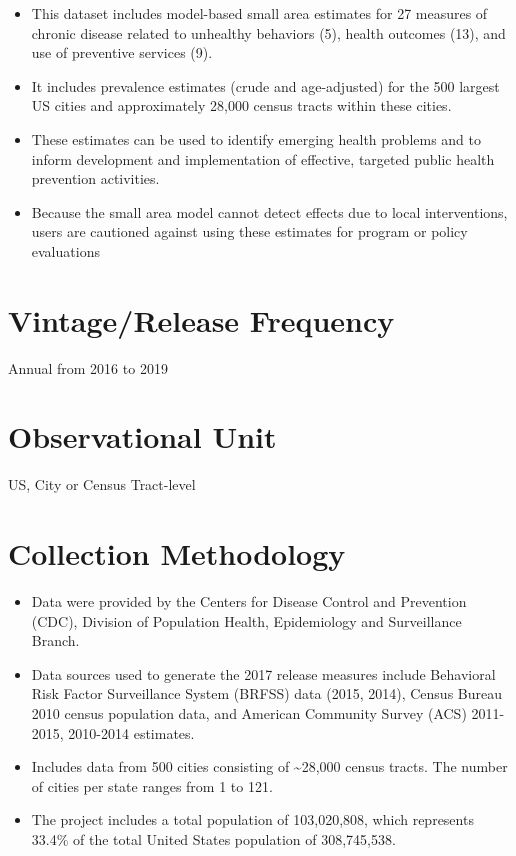 \documentclass[
]{book}
\providecommand{\tightlist}{%
  \setlength{\itemsep}{0pt}\setlength{\parskip}{0pt}}
\begin{document}
\begin{itemize}
\tightlist
\item
  This dataset includes model-based small area estimates for 27 measures of chronic disease related to unhealthy behaviors (5), health outcomes (13), and use of preventive services (9).
\item
  It includes prevalence estimates (crude and age-adjusted) for the 500 largest US cities and approximately 28,000 census tracts within these cities.
\item
  These estimates can be used to identify emerging health problems and to inform development and implementation of effective, targeted public health prevention activities.
\item
  Because the small area model cannot detect effects due to local interventions, users are cautioned against using these estimates for program or policy evaluations
\end{itemize}

\hypertarget{vintagerelease-frequency-99}{%
\section{Vintage/Release Frequency}\label{vintagerelease-frequency-99}}

Annual from 2016 to 2019

\hypertarget{observational-unit-99}{%
\section{Observational Unit}\label{observational-unit-99}}

US, City or Census Tract-level

\hypertarget{collection-methodology-99}{%
\section{Collection Methodology}\label{collection-methodology-99}}

\begin{itemize}
\tightlist
\item
  Data were provided by the Centers for Disease Control and Prevention (CDC), Division of Population Health, Epidemiology and Surveillance Branch.
\item
  Data sources used to generate the 2017 release measures include Behavioral Risk Factor Surveillance System (BRFSS) data (2015, 2014), Census Bureau 2010 census population data, and American Community Survey (ACS) 2011-2015, 2010-2014 estimates.
\item
  Includes data from 500 cities consisting of \textasciitilde28,000 census tracts. The number of cities per state ranges from 1 to 121.
\item
  The project includes a total population of 103,020,808, which represents 33.4\% of the total United States population of 308,745,538.
\end{itemize}
\end{document}
